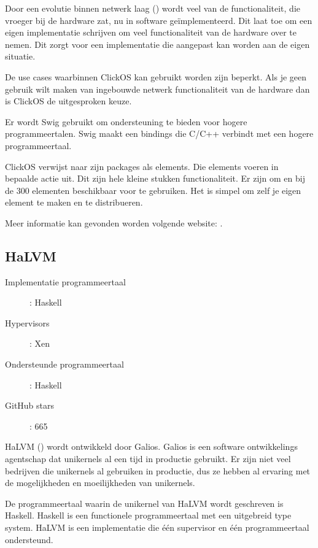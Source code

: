 \documentclass[pdftex,a4paper,12pt,twoside]{report}
\begin{document}
Door een evolutie binnen netwerk laag (\cite{garcia_villalba_trends_2015}) wordt veel van de functionaliteit, die vroeger bij de hardware zat, nu in software geïmplementeerd. Dit laat toe om een eigen implementatie schrijven om veel functionaliteit van de hardware over te nemen.
Dit zorgt voor een implementatie die aangepast kan worden aan de eigen situatie.

De use cases waarbinnen ClickOS kan gebruikt worden zijn beperkt. Als je geen gebruik wilt maken van ingebouwde netwerk functionaliteit van de hardware dan is ClickOS de uitgesproken keuze.

Er wordt Swig gebruikt om ondersteuning te bieden voor hogere programmeertalen. Swig maakt een bindings die C/C++ verbindt met een hogere programmeertaal.

ClickOS verwijst naar zijn packages als elements. Die elements voeren in bepaalde actie uit. Dit zijn hele kleine stukken functionaliteit. Er zijn om en bij de 300 elementen beschikbaar voor te gebruiken. Het is simpel om zelf je eigen element te maken en te distribueren.

Meer informatie kan gevonden worden volgende website: \cite{cloud_networking_performance_lab_cloud_????}.

\subsection{HaLVM}

\begin{description}
  \item [Implementatie programmeertaal]: Haskell
  \item [Hypervisors]: Xen
  \item [Ondersteunde programmeertaal]: Haskell
  \item [GitHub stars]: 665
\end{description}

HaLVM (\cite{galois_inc._haskell_????}) wordt ontwikkeld door Galios. Galios is een software ontwikkelings agentschap dat unikernels al een tijd in productie gebruikt.
Er zijn niet veel bedrijven die unikernels al gebruiken in productie, dus ze hebben al ervaring met de mogelijkheden en moeilijkheden van unikernels.

De programmeertaal waarin de unikernel van HaLVM wordt geschreven is Haskell. Haskell is een functionele programmeertaal met een uitgebreid type system. HaLVM is een implementatie die één supervisor en één programmeertaal ondersteund.
\end{document}
